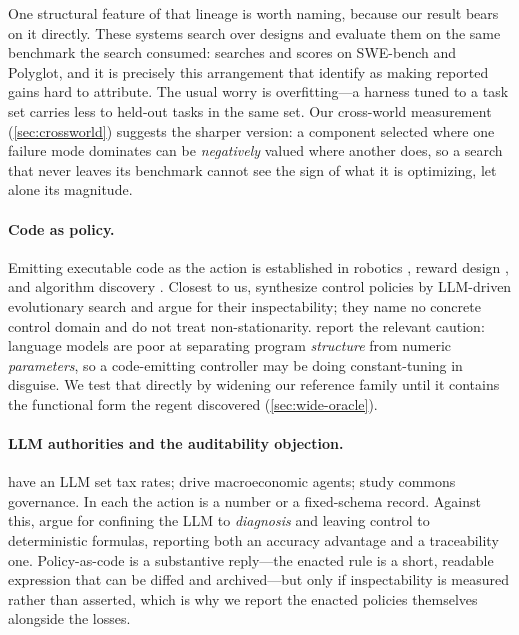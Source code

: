 \documentclass[11pt]{article}
\begin{document}
One structural feature of that lineage is worth naming, because our result bears on it directly.
These systems search over designs and evaluate them on the same benchmark the search consumed:
\citet{zhang2025dgm} searches and scores on SWE-bench and Polyglot, and it is precisely this
arrangement that \citet{wang2026rethinking} identify as making reported gains hard to attribute. The
usual worry is overfitting---a harness tuned to a task set carries less to held-out tasks in the same
set. Our cross-world measurement (\cref{sec:crossworld}) suggests the sharper version: a component
selected where one failure mode dominates can be \emph{negatively} valued where another does, so a
search that never leaves its benchmark cannot see the sign of what it is optimizing, let alone its
magnitude.

\paragraph{Code as policy.}
Emitting executable code as the action is established in robotics
\citep{liang2022codeaspolicies}, reward design \citep{ma2023eureka}, and algorithm discovery
\citep{novikov2025alphaevolve}. Closest to us, \citet{guo2026codeevolution} synthesize control
policies by LLM-driven evolutionary search and argue for their inspectability; they name no concrete
control domain and do not treat non-stationarity. \citet{bosio2025combining} report the relevant
caution: language models are poor at separating program \emph{structure} from numeric
\emph{parameters}, so a code-emitting controller may be doing constant-tuning in disguise. We test
that directly by widening our reference family until it contains the functional form the regent
discovered (\cref{sec:wide-oracle}).

\paragraph{LLM authorities and the auditability objection.}
\citet{wang2025taxagent} have an LLM set tax rates; \citet{li2023econagent} drive macroeconomic
agents; \citet{piatti2024govsim} study commons governance. In each the action is a number or a
fixed-schema record. Against this, \citet{zhong2026separating} argue for confining the LLM to
\emph{diagnosis} and leaving control to deterministic formulas, reporting both an accuracy advantage
and a traceability one. Policy-as-code is a substantive reply---the enacted rule is a short, readable
expression that can be diffed and archived---but only if inspectability is measured rather than
asserted, which is why we report the enacted policies themselves alongside the losses.
\end{document}
